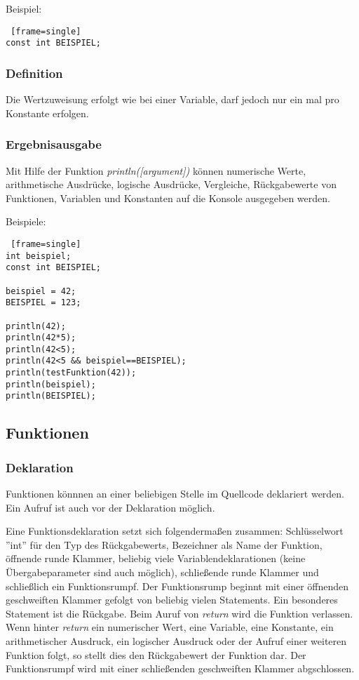 Beispiel:
\begin{lstlisting} [frame=single] 
const int BEISPIEL;
\end{lstlisting}

\subsubsection{Definition}
Die Wertzuweisung erfolgt wie bei einer Variable, darf jedoch nur ein mal pro Konstante erfolgen.
 

\subsubsection{Ergebnisausgabe}
Mit Hilfe der Funktion \textit{println([argument])} können numerische Werte, arithmetische Ausdrücke, logische Ausdrücke, Vergleiche, Rückgabewerte von Funktionen, Variablen und Konstanten auf die Konsole ausgegeben werden.

Beispiele:
\begin{lstlisting} [frame=single] 
int beispiel;
const int BEISPIEL;

beispiel = 42;
BEISPIEL = 123;

println(42);
println(42*5);
println(42<5);
println(42<5 && beispiel==BEISPIEL);
println(testFunktion(42));
println(beispiel);
println(BEISPIEL);
\end{lstlisting}


\subsection{Funktionen}

\subsubsection{Deklaration}
Funktionen könnnen an einer beliebigen Stelle im Quellcode deklariert werden. Ein Aufruf ist auch vor der Deklaration möglich.

Eine Funktionsdeklaration setzt sich folgendermaßen zusammen:
Schlüsselwort ''int'' für den Typ des Rückgabewerts, Bezeichner als Name der Funktion, öffnende runde Klammer, beliebig viele Variablendeklarationen (keine Übergabeparameter sind auch möglich), schließende runde Klammer und schließlich ein Funktionsrumpf.
Der Funktionsrump beginnt mit einer öffnenden geschweiften Klammer gefolgt von beliebig vielen Statements. 
Ein besonderes Statement ist die Rückgabe. Beim Auruf von \textit{return} wird die Funktion verlassen. Wenn hinter \textit{return} ein numerischer Wert, eine Variable, eine Konstante, ein arithmetischer Ausdruck, ein logischer Ausdruck oder der Aufruf einer weiteren Funktion folgt, so stellt dies den Rückgabewert der Funktion dar.
Der Funktionsrumpf wird mit einer schließenden geschweiften Klammer abgschlossen.

